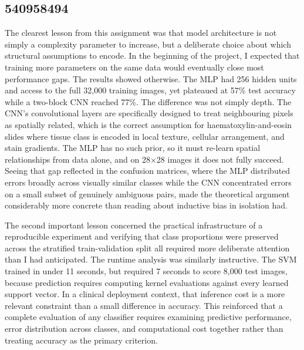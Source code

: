 \documentclass[../main.tex]{subfiles}
\begin{document}
\subsection*{540958494}
\noindent
\noindent
{The clearest lesson from this assignment was that model architecture is not simply a complexity parameter to increase, but a deliberate choice about which structural assumptions to encode. In the beginning of the project, I expected that training more parameters on the same data would eventually close most performance gaps. The results showed otherwise. The MLP had 256 hidden units and access to the full 32,000 training images, yet plateaued at 57\% test accuracy while a two-block CNN reached 77\%. The difference was not simply depth. The CNN's convolutional layers are specifically designed to treat neighbouring pixels as spatially related, which is the correct assumption for haematoxylin-and-eosin slides where tissue class is encoded in local texture, cellular arrangement, and stain gradients. The MLP has no such prior, so it must re-learn spatial relationships from data alone, and on 28×28 images it does not fully succeed. Seeing that gap reflected in the confusion matrices, where the MLP distributed errors broadly across visually similar classes while the CNN concentrated errors on a small subset of genuinely ambiguous pairs, made the theoretical argument considerably more concrete than reading about inductive bias in isolation had.

\noindent
The second important lesson concerned the practical infrastructure of a reproducible experiment and verifying that class proportions were preserved across the stratified train-validation split all required more deliberate attention than I had anticipated. The runtime analysis was similarly instructive. The SVM trained in under 11 seconds, but required 7 seconds to score 8,000 test images, because prediction requires computing kernel evaluations against every learned support vector. In a clinical deployment context, that inference cost is a more relevant constraint than a small difference in accuracy. This reinforced that a complete evaluation of any classifier requires examining predictive performance, error distribution across classes, and computational cost together rather than treating accuracy as the primary criterion.}
\end{document}
